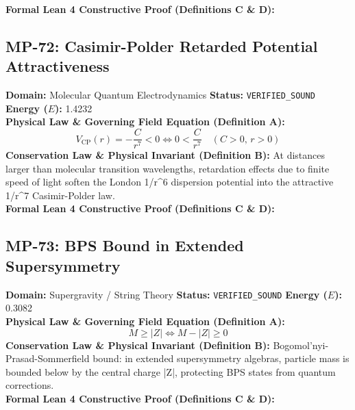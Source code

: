 \textbf{Formal Lean 4 Constructive Proof (Definitions C \& D):}


\vspace{1em}
\subsection{MP-72: Casimir-Polder Retarded Potential Attractiveness}
\textbf{Domain:} Molecular Quantum Electrodynamics \hfill \textbf{Status:} \texttt{VERIFIED\_SOUND} \hfill \textbf{Energy ($E$):} 1.4232\\
\textbf{Physical Law \& Governing Field Equation (Definition A):}
\begin{equation*}
V_{\text{CP}}(r) = -\frac{C}{r^7} < 0 \iff 0 < \frac{C}{r^7} \quad (C > 0, \, r > 0)
\end{equation*}
\textbf{Conservation Law \& Physical Invariant (Definition B):}
At distances larger than molecular transition wavelengths, retardation effects due to finite speed of light soften the London 1/r\textasciicircum{}6 dispersion potential into the attractive 1/r\textasciicircum{}7 Casimir-Polder law.\\

\textbf{Formal Lean 4 Constructive Proof (Definitions C \& D):}


\vspace{1em}
\subsection{MP-73: BPS Bound in Extended Supersymmetry}
\textbf{Domain:} Supergravity / String Theory \hfill \textbf{Status:} \texttt{VERIFIED\_SOUND} \hfill \textbf{Energy ($E$):} 0.3082\\
\textbf{Physical Law \& Governing Field Equation (Definition A):}
\begin{equation*}
M \ge |Z| \iff M - |Z| \ge 0
\end{equation*}
\textbf{Conservation Law \& Physical Invariant (Definition B):}
Bogomol'nyi-Prasad-Sommerfield bound: in extended supersymmetry algebras, particle mass is bounded below by the central charge |Z|, protecting BPS states from quantum corrections.\\

\textbf{Formal Lean 4 Constructive Proof (Definitions C \& D):}


\vspace{1em}
